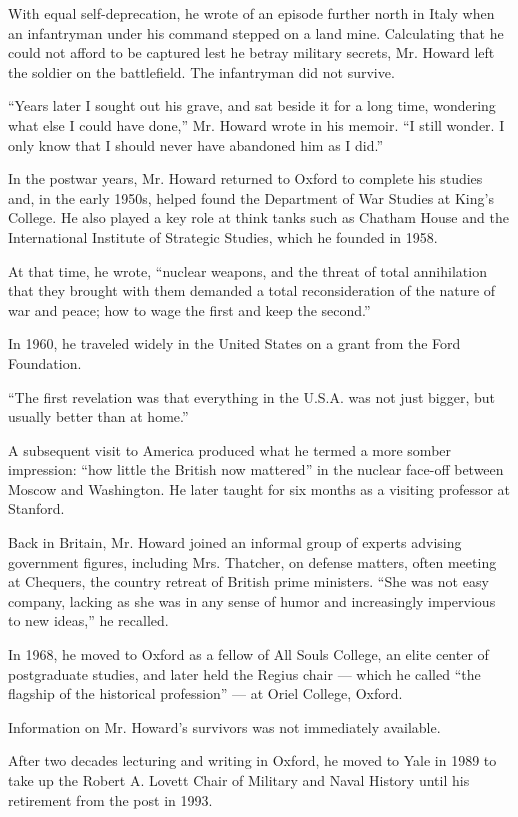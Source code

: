 With equal self-deprecation, he wrote of an episode further north in
Italy when an infantryman under his command stepped on a land mine.
Calculating that he could not afford to be captured lest he betray
military secrets, Mr. Howard left the soldier on the battlefield. The
infantryman did not survive.

``Years later I sought out his grave, and sat beside it for a long time,
wondering what else I could have done,'' Mr. Howard wrote in his memoir.
``I still wonder. I only know that I should never have abandoned him as
I did.''

In the postwar years, Mr. Howard returned to Oxford to complete his
studies and, in the early 1950s, helped found the Department of War
Studies at King's College. He also played a key role at think tanks such
as Chatham House and the International Institute of Strategic Studies,
which he founded in 1958.

At that time, he wrote, ``nuclear weapons, and the threat of total
annihilation that they brought with them demanded a total
reconsideration of the nature of war and peace; how to wage the first
and keep the second.''

In 1960, he traveled widely in the United States on a grant from the
Ford Foundation.

``The first revelation was that everything in the U.S.A. was not just
bigger, but usually better than at home.''

A subsequent visit to America produced what he termed a more somber
impression: ``how little the British now mattered'' in the nuclear
face-off between Moscow and Washington. He later taught for six months
as a visiting professor at Stanford.

Back in Britain, Mr. Howard joined an informal group of experts advising
government figures, including Mrs. Thatcher, on defense matters, often
meeting at Chequers, the country retreat of British prime ministers.
``She was not easy company, lacking as she was in any sense of humor and
increasingly impervious to new ideas,'' he recalled.

In 1968, he moved to Oxford as a fellow of All Souls College, an elite
center of postgraduate studies, and later held the Regius chair ---
which he called ``the flagship of the historical profession'' --- at
Oriel College, Oxford.

Information on Mr. Howard's survivors was not immediately available.

After two decades lecturing and writing in Oxford, he moved to Yale in
1989 to take up the Robert A. Lovett Chair of Military and Naval History
until his retirement from the post in 1993.

